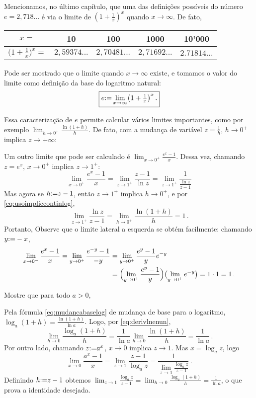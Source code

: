 Mencionamos, no último capítulo, que uma das definições possíveis do
número $e=2,718...$ é via o limite de $(1+\tfrac1x)^x$
quando $x\to \infty$. De fato,
\begin{center}
\begin{tabular}{c|c|c|c|c}
$x=$&10&100&1000&10'000\\
\hline
$(1+\tfrac1x\bigr)^x=$&$2,59374...$&$2,70481...$&$2,
71692...$&$2.71814...$
\end{tabular}
\end{center}
Pode ser mostrado que o limite quando $x\to \infty$
existe, e tomamos o valor do limite como definição da base do logaritmo natural:
$$\boxed{e{:=} \lim_{x\to \infty}\bigl(1+\tfrac1x\bigr)^x\,.}$$

Essa caracterização de $e$ permite calcular vários limites importantes,
como por exemplo
$\lim_{h\to 0^+}\frac{\ln(1+h)}{h}$.
De fato, com a mudança de variável $z=\frac{1}{h}$, $h\to 0^+$ implica $z\to +\infty$:

Um outro limite que pode ser calculado é $\lim_{x\to 0^+}\frac{e^x-1}{x}$. Dessa
vez, chamando $z=e^x$, $x\to 0^+$ implica $z\to 1^+$:
$$
\lim_{x\to 0^+}\frac{e^x-1}{x}=\lim_{z\to 1^+}\frac{z-1}{\ln
z}=\lim_{z\to
1^+}\frac{1}{\frac{\ln z}{z-1}}$$
Mas agora se $h{:=} z-1$, então $z\to 1^+$ implica $h\to 0^+$, e 
por \eqref{eq:usoimpliccontinlog},
$$
\lim_{z\to 1^+}\frac{\ln z}{z-1}=\lim_{h\to 0^+}\frac{\ln (1+h)}{h}=1\,.
$$
Portanto, 
Observe que o limite lateral a esquerda se obtém facilmente: chamando $y{:=} -x$,
\begin{align*}
\lim_{x\to 0^-}\frac{e^x-1}{x}
=\lim_{y\to 0^+}\frac{e^{-y}-1}{-y}&=\lim_{y\to 0^+}\frac{e^{y}-1}{y}e^{-y}\\
&=\Bigl(\lim_{y\to 0^+}\frac{e^{y}-1}{y}\Bigr)\bigl(\lim_{y\to 0^+}e^{-y}\bigr)=1\cdot 1=1\,.
\end{align*}


\begin{exo}
Mostre que  para todo $a>0$,
\begin{sol}
Pela fórmula \eqref{eq:mudancabaselog} de mudança de base para o
logaritmo, $\log_a(1+h)=\frac{\ln(1+h)}{\ln a}$. Logo, por
\eqref{eq:derivlnenun},
$$\lim_{h\to 0}\frac{\log_a(1+h)}{h}=\frac{1}{\ln a}\lim_{h\to
0}\frac{\ln(1+h)}{h}=\frac{1}{\ln a}\,.$$
Por outro lado, chamando $z{:=} a^x$, $x\to 0$ implica $z\to 1$.
Mas $x=\log_az$, logo
$$
\lim_{x\to
0}\frac{a^x-1}{x}=\lim_{z\to 1}\frac{z-1}{\log_a
z}=\frac{1}{\lim_{z\to 1}\frac{\log_az}{z-1}}\,.
$$
Definindo $h{:=} z-1$ obtemos $\lim_{z\to
1}\frac{\log_az}{z-1}=\lim_{h\to 0}\frac{\log_a(1+h)}{h}=\frac{1}{\ln
a}$, o que prova a identidade desejada.
\end{sol}
\end{exo}

